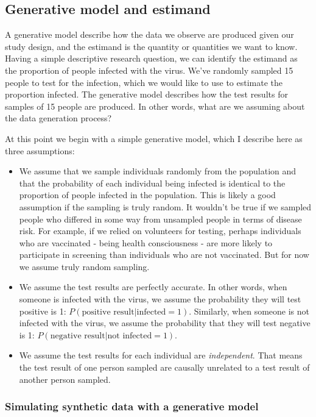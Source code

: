 \documentclass[
]{book}
\begin{document}
\subsection{Generative model and estimand}\label{generative-model-and-estimand}

A generative model describe how the data we observe are produced given
our study design, and the estimand is the quantity or quantities we want
to know. Having a simple descriptive research question, we can identify
the estimand as the proportion of people infected with the virus. We've
randomly sampled 15 people to test for the infection, which we would
like to use to estimate the proportion infected. The generative model
describes how the test results for samples of 15 people are produced. In
other words, what are we assuming about the data generation process?

At this point we begin with a simple generative model, which I describe
here as three assumptions:

\begin{itemize}
\item
  We assume that we sample individuals randomly from the population
  and that the probability of each individual being infected is
  identical to the proportion of people infected in the population.
  This is likely a good assumption if the sampling is truly random. It
  wouldn't be true if we sampled people who differed in some way from
  unsampled people in terms of disease risk. For example, if we relied
  on volunteers for testing, perhaps individuals who are vaccinated -
  being health consciousness - are more likely to participate in
  screening than individuals who are not vaccinated. But for now we
  assume truly random sampling.
\item
  We assume the test results are perfectly accurate. In other words,
  when someone is infected with the virus, we assume the probability
  they will test positive is 1:
  \(P(\text{positive result} | \text{infected} = 1)\). Similarly, when
  someone is not infected with the virus, we assume the probability
  that they will test negative is 1:
  \(P(\text{negative result} | \text{not infected} = 1)\).
\item
  We assume the test results for each individual are \emph{independent}.
  That means the test result of one person sampled are causally
  unrelated to a test result of another person sampled.
\end{itemize}

\subsubsection{Simulating synthetic data with a generative model}\label{simulating-synthetic-data-with-a-generative-model}
\end{document}

